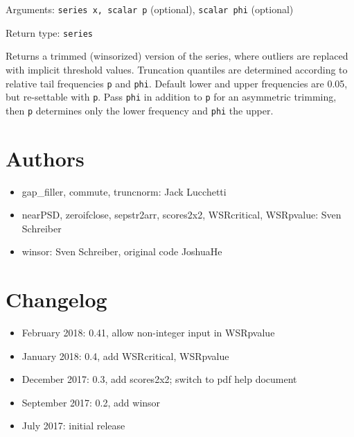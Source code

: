 \documentclass[11pt,english]{article}
\begin{document}
Arguments: \texttt{series x, scalar p} (optional), \texttt{scalar
phi} (optional) 

\noindent Return type: \texttt{series}

Returns a trimmed (\textquotedbl winsorized\textquotedbl ) version
of the series, where outliers are replaced with implicit threshold
values. Truncation quantiles are determined according to relative
tail frequencies \texttt{p} and \texttt{phi}. Default lower and upper
frequencies are 0.05, but re-settable with \texttt{p}. Pass \texttt{phi}
in addition to \texttt{p} for an asymmetric trimming, then \texttt{p}
determines only the lower frequency and \texttt{phi} the upper. 

\section{Authors}
\begin{itemize}
\item gap\_filler, commute, truncnorm: Jack Lucchetti
\item nearPSD, zeroifclose, sepstr2arr, scores2x2, WSRcritical, WSRpvalue:
Sven Schreiber 
\item winsor: Sven Schreiber, original code JoshuaHe
\end{itemize}

\section{Changelog }
\begin{itemize}
\item February 2018: 0.41, allow non-integer input in WSRpvalue
\item January 2018: 0.4, add WSRcritical, WSRpvalue
\item December 2017: 0.3, add scores2x2; switch to pdf help document
\item September 2017: 0.2, add winsor 
\item July 2017: initial release
\end{itemize}
\end{document}
